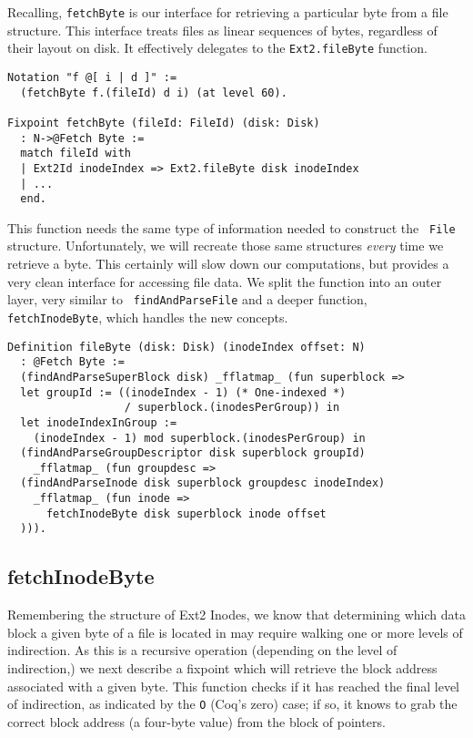 \documentclass[nocopyrightspace,preprint]{sigplanconf}
\begin{document}
Recalling, {\tt fetchByte} is our interface for retrieving a particular byte
from a file structure. This interface treats files as linear sequences of
bytes, regardless of their layout on disk. It effectively delegates to the
{\tt Ext2.fileByte} function.

\begin{lstlisting}
Notation "f @[ i | d ]" := 
  (fetchByte f.(fileId) d i) (at level 60).

Fixpoint fetchByte (fileId: FileId) (disk: Disk)
  : N->@Fetch Byte := 
  match fileId with
  | Ext2Id inodeIndex => Ext2.fileByte disk inodeIndex
  | ...
  end.
\end{lstlisting}

This function needs the same type of information needed to construct the {\tt
File} structure. Unfortunately, we will recreate those same structures {\em
every} time we retrieve a byte. This certainly will slow down our
computations, but provides a very clean interface for accessing file data. We
split the function into an outer layer, very similar to {\tt
findAndParseFile} and a deeper function, {\tt fetchInodeByte}, which handles
the new concepts.

\begin{lstlisting}
Definition fileByte (disk: Disk) (inodeIndex offset: N)
  : @Fetch Byte :=
  (findAndParseSuperBlock disk) _fflatmap_ (fun superblock =>
  let groupId := ((inodeIndex - 1) (* One-indexed *)
                  / superblock.(inodesPerGroup)) in
  let inodeIndexInGroup :=
    (inodeIndex - 1) mod superblock.(inodesPerGroup) in
  (findAndParseGroupDescriptor disk superblock groupId) 
    _fflatmap_ (fun groupdesc =>
  (findAndParseInode disk superblock groupdesc inodeIndex)
    _fflatmap_ (fun inode =>
      fetchInodeByte disk superblock inode offset
  ))).
\end{lstlisting}

\subsection{fetchInodeByte}

Remembering the structure of Ext2 Inodes, we know that determining which data
block a given byte of a file is located in may require walking one or more
levels of indirection. As this is a recursive operation (depending on the
level of indirection,) we next describe a fixpoint which will retrieve the
block address associated with a given byte. This function checks if it has
reached the final level of indirection, as indicated by the {\tt O} (Coq's
zero) case; if so, it knows to grab the correct block address (a four-byte
value) from the block of pointers.
\end{document}
